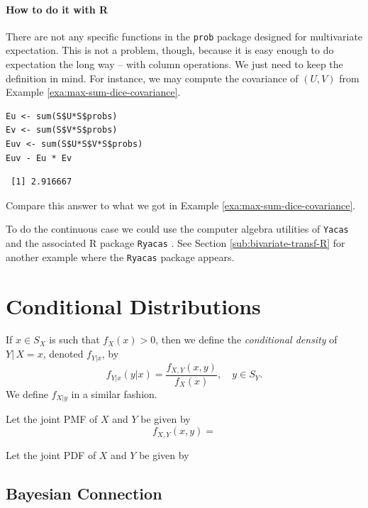 \documentclass[captions=tableheading]{scrbook}
\begin{document}
\paragraph*{How to do it with \textsf{R}}

There are not any specific functions in the \texttt{prob} package designed for multivariate expectation. This is not a problem, though, because it is easy enough to do expectation the long way -- with column operations. We just need to keep the definition in mind. For instance, we may compute the covariance of \((U,V)\) from Example \ref{exa:max-sum-dice-covariance}.


\begin{verbatim}
Eu <- sum(S$U*S$probs)
Ev <- sum(S$V*S$probs)
Euv <- sum(S$U*S$V*S$probs)
Euv - Eu * Ev
\end{verbatim}

\begin{verbatim}
 [1] 2.916667
\end{verbatim}

Compare this answer to what we got in Example \ref{exa:max-sum-dice-covariance}.

To do the continuous case we could use the computer algebra utilities of \texttt{Yacas} and the associated \textsf{R} package \texttt{Ryacas} \cite{ryacas}. See Section \ref{sub:bivariate-transf-R} for another example where the \texttt{Ryacas} package appears.
\section{Conditional Distributions}
\label{sec-7-3}

\label{sec:Conditional-Distributions}

If \(x\in S_{X}\) is such that \(f_{X}(x)>0\), then we define the \emph{conditional density} of \(Y|\, X=x\), denoted \(f_{Y|x}\), by 
\begin{equation}
f_{Y|x}(y|x)=\frac{f_{X,Y}(x,y)}{f_{X}(x)},\quad y\in S_{Y}.
\end{equation}
We define \(f_{X|y}\) in a similar fashion.

\begin{example}
Let the joint PMF of \(X\) and \(Y\) be given by
\[
f_{X,Y}(x,y)=
\]
\end{example}

\begin{example}
Let the joint PDF of \(X\) and \(Y\) be given by
\end{example}
\subsection{Bayesian Connection}
\label{sec-7-3-1}
\end{document}
